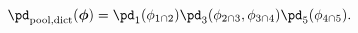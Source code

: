 \begin{equation}
  \pd_{\text{pool,dict}}(\boldsymbol{\phi}) =
    \pd_{1}(\phi_{1 \cap 2})
    \pd_{3}(\phi_{2 \cap 3}, \phi_{3 \cap 4})
    \pd_{5}(\phi_{4 \cap 5}).
  \label{eqn:dictatorial-def-two-example-one}
\end{equation}
